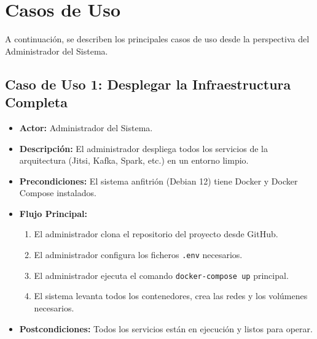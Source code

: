 \section{Casos de Uso}
A continuación, se describen los principales casos de uso desde la perspectiva del Administrador del Sistema.

\subsection{Caso de Uso 1: Desplegar la Infraestructura Completa}
\begin{itemize}
    \item \textbf{Actor:} Administrador del Sistema.
    \item \textbf{Descripción:} El administrador despliega todos los servicios de la arquitectura (Jitsi, Kafka, Spark, etc.) en un entorno limpio.
    \item \textbf{Precondiciones:} El sistema anfitrión (Debian 12) tiene Docker y Docker Compose instalados.
    \item \textbf{Flujo Principal:}
        \begin{enumerate}
            \item El administrador clona el repositorio del proyecto desde GitHub.
            \item El administrador configura los ficheros \texttt{.env} necesarios.
            \item El administrador ejecuta el comando \texttt{docker-compose up} principal.
            \item El sistema levanta todos los contenedores, crea las redes y los volúmenes necesarios.
        \end{enumerate}
    \item \textbf{Postcondiciones:} Todos los servicios están en ejecución y listos para operar.
\end{itemize}

